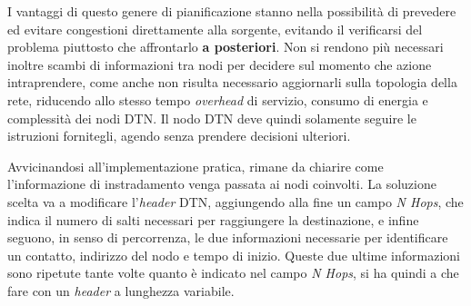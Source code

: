 \documentclass[a4paper]{article}
\begin{document}
		I vantaggi di questo genere di pianificazione stanno nella possibilità di prevedere ed evitare congestioni direttamente alla sorgente, evitando il verificarsi del problema piuttosto che affrontarlo {\bf a posteriori}. Non si rendono più necessari inoltre scambi di informazioni tra nodi per decidere sul momento che azione intraprendere, come anche non risulta necessario aggiornarli sulla topologia della rete, riducendo allo stesso tempo {\it overhead} di servizio, consumo di energia e complessità dei nodi DTN. Il nodo DTN deve quindi solamente seguire le istruzioni fornitegli, agendo senza prendere decisioni ulteriori.
		
		Avvicinandosi all'implementazione pratica, rimane da chiarire come l'informazione di instradamento venga passata ai nodi coinvolti. La soluzione scelta va a modificare l'{\it header} DTN, aggiungendo alla fine un campo \emph{N Hops}, che indica il numero di salti necessari per raggiungere la destinazione, e infine seguono, in senso di percorrenza, le due informazioni necessarie per identificare un contatto, indirizzo del nodo e tempo di inizio. Queste due ultime informazioni sono ripetute tante volte quanto è indicato nel campo \emph{N Hops}, si ha quindi a che fare con un {\it header} a lunghezza variabile.
		
		
\end{document}
